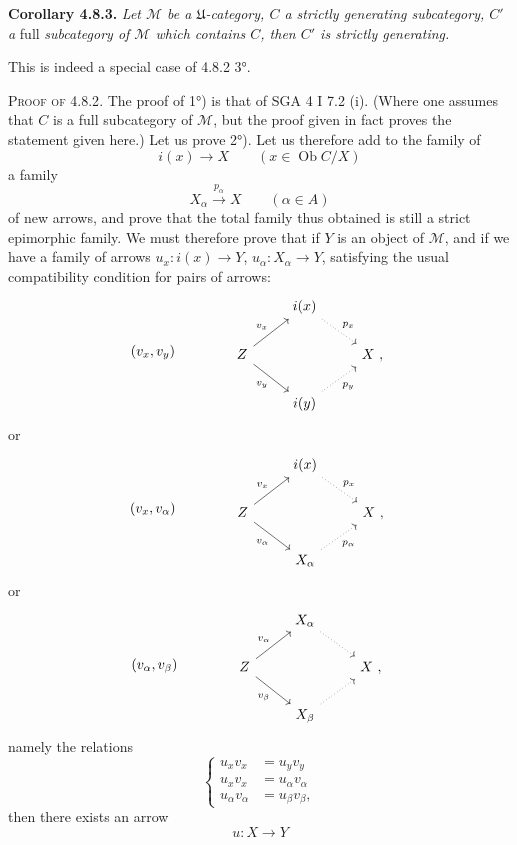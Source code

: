 \documentclass[11pt]{article}
\newcommand{\printedpage}[1]{\marginpar{\footnotesize p.~#1}}
\newcommand{\msp}[1]{\marginpar{\footnotesize [#1]}}
\newcommand{\Ob}{\operatorname{Ob}}
\begin{document}
\textbf{Corollary 4.8.3.} \textit{Let $\mathcal{M}$ be a $\mathfrak{U}$-category, $C$ a strictly generating subcategory, $C'$ a} full \textit{subcategory of $\mathcal{M}$ which contains $C$, then $C'$ is strictly generating.}

This is indeed a special case of 4.8.2 3°.

\msp{page 194}

\textsc{Proof of 4.8.2}. The proof of 1°) is that of SGA 4 I 7.2 (i). (Where one assumes that $C$ is a full subcategory of $\mathcal{M}$, but the proof given in fact proves the statement given here.) Let us prove 2°). Let us therefore add to the family of
\[ i(x) \longrightarrow X \qquad (x \in \Ob C/X) \]
a family
\[ X_\alpha \xrightarrow{p_\alpha} X \qquad (\alpha \in A) \]
of new arrows, and prove that the total family thus obtained is still a strict epimorphic family. We must therefore prove that if $Y$ is an object of $\mathcal{M}$, and if we have a family of arrows $u_x : i(x) \longrightarrow Y$, $u_\alpha : X_\alpha \longrightarrow Y$, satisfying the usual compatibility condition for pairs of arrows:
\[ (v_x,v_y) \qquad\qquad \begin{tikzcd}
& i(x) \arrow[dr, dotted, "p_x"] & \\
Z \arrow[ur, "v_x"] \arrow[dr, "v_y"'] & & X\ , \\
& i(y) \arrow[ur, dotted, "p_y"'] &
\end{tikzcd} \]
or
\printedpage{68}
\[ (v_x,v_\alpha) \qquad\qquad \begin{tikzcd}
& i(x) \arrow[dr, dotted, "p_x"] & \\
Z \arrow[ur, "v_x"] \arrow[dr, "v_\alpha"'] & & X\ , \\
& X_\alpha \arrow[ur, dotted, "p_\alpha"'] &
\end{tikzcd} \]
\msp{page 195}
or
\[ (v_\alpha,v_\beta) \qquad\qquad \begin{tikzcd}
& X_\alpha \arrow[dr, dotted] & \\
Z \arrow[ur, "v_\alpha"] \arrow[dr, "v_\beta"'] & & X\ , \\
& X_\beta \arrow[ur, dotted] &
\end{tikzcd} \]
namely the relations
\[ \left\{\begin{aligned}
u_xv_x &= u_yv_y\\
u_xv_x &= u_\alpha v_\alpha\\
u_\alpha v_\alpha &= u_\beta v_\beta ,
\end{aligned}\right. \tag*{($*$)} \]
then there exists an arrow
\[ u : X \longrightarrow Y \]
\end{document}
